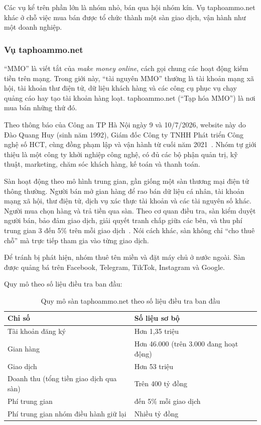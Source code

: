 Các vụ kể trên phần lớn là nhóm nhỏ, bán qua hội nhóm kín. Vụ taphoammo.net khác ở chỗ việc mua bán được tổ chức thành một sàn giao dịch, vận hành như một doanh nghiệp.

\subsubsection{Vụ taphoammo.net}\label{sec:1.1.2}

“MMO” là viết tắt của \textit{make money online}, cách gọi chung các hoạt động kiếm tiền trên mạng. Trong giới này, “tài nguyên MMO” thường là tài khoản mạng xã hội, tài khoản thư điện tử, dữ liệu khách hàng và các công cụ phục vụ chạy quảng cáo hay tạo tài khoản hàng loạt. taphoammo.net (“Tạp hóa MMO”) là nơi mua bán những thứ đó.

Theo thông báo của Công an TP Hà Nội ngày 9 và 10/7/2026, website này do Đào Quang Huy (sinh năm 1992), Giám đốc Công ty TNHH Phát triển Công nghệ số HCT, cùng đồng phạm lập và vận hành từ cuối năm 2021~\cite{cand-2026,vnn-2026}. Nhóm tự giới thiệu là một công ty khởi nghiệp công nghệ, có đủ các bộ phận quản trị, kỹ thuật, marketing, chăm sóc khách hàng, kế toán và thanh toán.

Sàn hoạt động theo mô hình trung gian, gần giống một sàn thương mại điện tử thông thường. Người bán mở gian hàng để rao bán dữ liệu cá nhân, tài khoản mạng xã hội, thư điện tử, dịch vụ xác thực tài khoản và các tài nguyên số khác. Người mua chọn hàng và trả tiền qua sàn. Theo cơ quan điều tra, sàn kiểm duyệt người bán, bảo đảm giao dịch, giải quyết tranh chấp giữa các bên, và thu phí trung gian 3 đến 5\% trên mỗi giao dịch~\cite{vnn-2026}. Nói cách khác, sàn không chỉ “cho thuê chỗ” mà trực tiếp tham gia vào từng giao dịch.

Để tránh bị phát hiện, nhóm thuê tên miền và đặt máy chủ ở nước ngoài. Sàn được quảng bá trên Facebook, Telegram, TikTok, Instagram và Google.

Quy mô theo số liệu điều tra ban đầu:

{\small{}
\begin{table}[H]
\centering
\caption{Quy mô sàn taphoammo.net theo số liệu điều tra ban đầu}\label{tab:1.1}
\begin{tabularx}{\textwidth}{>{\hsize=0.945\hsize\raggedright\arraybackslash}X>{\hsize=1.055\hsize\raggedright\arraybackslash}X}
\toprule
\textbf{Chỉ số} & \textbf{Số liệu sơ bộ} \\
\midrule
Tài khoản đăng ký & Hơn 1,35 triệu \\
Gian hàng & Hơn 46.000 (trên 3.000 đang hoạt động) \\
Giao dịch & Hơn 53 triệu \\
Doanh thu (tổng tiền giao dịch qua sàn) & Trên 400 tỷ đồng \\
Phí trung gian & 3 đến 5\% mỗi giao dịch \\
Phí trung gian nhóm điều hành giữ lại & Nhiều tỷ đồng \\
\bottomrule
\end{tabularx}
\end{table}}

